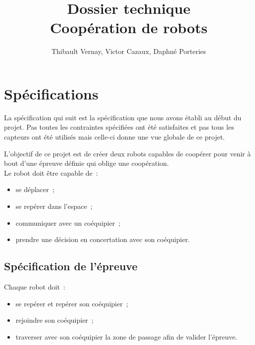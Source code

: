 \documentclass{article}
\title{Dossier technique\\Coopération de robots}
\author{Thibault Vernay, Victor Cazaux, Daphné Porteries}
\begin{document}
\maketitle

\tableofcontents

\section{Spécifications}

La spécification qui suit est la spécification que nous avons établi au début du projet. Pas toutes les contraintes spécifiées ont été satisfaites et pas tous les capteurs ont été utilisés mais celle-ci donne une vue globale de ce projet.

L'objectif de ce projet est de créer deux robots capables de coopérer pour venir à bout d'une épreuve définie qui oblige une coopération. \\

Le robot doit être capable de~: \\

\begin{itemize}
  \item se déplacer~;
  \item se repérer dans l'espace~;
  \item communiquer avec un coéquipier~;
  \item prendre une décision en concertation avec son coéquipier.
\end{itemize}

\subsection{Spécification de l'épreuve}

Chaque robot doit~: \\

\begin{itemize}
  \item se repérer et repérer son coéquipier~;
  \item rejoindre son coéquipier~;
  \item traverser avec son coéquipier la zone de passage afin de valider l'épreuve.
\end{itemize}
\end{document}
